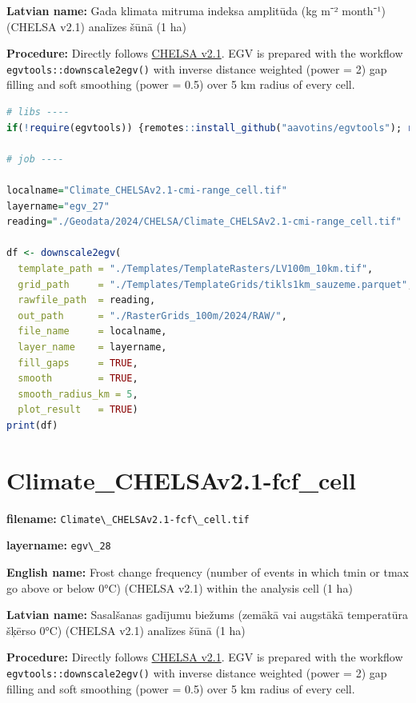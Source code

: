 \documentclass[
]{book}
\newcommand{\passthrough}[1]{#1}
\begin{document}
\textbf{Latvian name:} Gada klimata mitruma indeksa amplitūda (kg m⁻² month⁻¹) (CHELSA v2.1) analīzes šūnā (1 ha)

\textbf{Procedure:} Directly follows \hyperref[Ch04.11]{CHELSA v2.1}. EGV is prepared with the
workflow \passthrough{\lstinline!egvtools::downscale2egv()!} with inverse distance weighted (power = 2)
gap filling and soft smoothing (power = 0.5) over 5 km radius of every cell.

\begin{lstlisting}[language=R]
# libs ----
if(!require(egvtools)) {remotes::install_github("aavotins/egvtools"); require(egvtools)}

# job ----

localname="Climate_CHELSAv2.1-cmi-range_cell.tif"
layername="egv_27"
reading="./Geodata/2024/CHELSA/Climate_CHELSAv2.1-cmi-range_cell.tif"

df <- downscale2egv(
  template_path = "./Templates/TemplateRasters/LV100m_10km.tif",
  grid_path     = "./Templates/TemplateGrids/tikls1km_sauzeme.parquet",
  rawfile_path  = reading,
  out_path      = "./RasterGrids_100m/2024/RAW/",
  file_name     = localname,
  layer_name    = layername,
  fill_gaps     = TRUE,
  smooth        = TRUE,
  smooth_radius_km = 5,
  plot_result   = TRUE)
print(df)
\end{lstlisting}

\section{Climate\_CHELSAv2.1-fcf\_cell}\label{ch06.028}

\textbf{filename:} \passthrough{\lstinline!Climate\_CHELSAv2.1-fcf\_cell.tif!}

\textbf{layername:} \passthrough{\lstinline!egv\_28!}

\textbf{English name:} Frost change frequency (number of events in which tmin or tmax go above or below 0°C) (CHELSA v2.1) within the analysis cell (1 ha)

\textbf{Latvian name:} Sasalšanas gadījumu biežums (zemākā vai augstākā temperatūra šķērso 0°C) (CHELSA v2.1) analīzes šūnā (1 ha)

\textbf{Procedure:} Directly follows \hyperref[Ch04.11]{CHELSA v2.1}. EGV is prepared with the
workflow \passthrough{\lstinline!egvtools::downscale2egv()!} with inverse distance weighted (power = 2)
gap filling and soft smoothing (power = 0.5) over 5 km radius of every cell.
\end{document}
